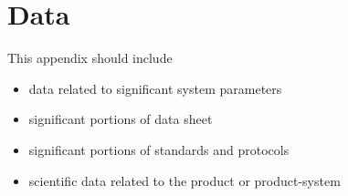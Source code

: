 
\chapter{Data}

This appendix should include
\begin{itemize}
\item data related to significant system parameters
\item significant portions of data sheet
\item significant portions of standards and protocols
\item scientific data related to the product or product-system\end{itemize}

